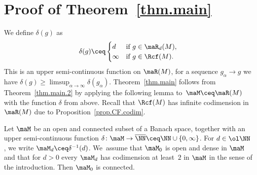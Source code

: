 \section{Proof of Theorem~\ref{thm.main}}\label{sec.proof.thm.main}

We define $\delta(g)$ as
\[
\delta(g)\ceq
\begin{cases}
 d & \text{if}\ g\in \maR_d(M),\\
\infty& \text{if}\ g\in \Rcf(M) .
\end{cases}
\]
This is an upper semi-continuous function on $\maR(M)$, \ie for a sequence $g_\alpha\to g$ we have $\delta(g)\geq \limsup_{\alpha\to \infty} \delta(g_\alpha)$. Theorem~\ref{thm.main} follows from Theorem~\ref{thm.main.2} by applying the following lemma to~$\maM\ceq \maR(M)$ with the function $\delta$ from above. Recall that $\Rcf(M)$ has infinite codimension in~$\maR(M)$ due to Proposition~\ref{prop.CF.codim}.

\begin{Lemma}
Let $\maM$ be an open and connected subset of a Banach space,
together with an upper semi-continuous function $\delta\colon \maM\to\overline\NN\ceq\NN\cup\{0,\infty\}$. For $d\in\ol\NN$, we write $\maM_d\ceq \delta^{-1}(d)$. We~assume that $\maM_0$ is open and dense in $\maM$ and that for $d>0$ every $\maM_d$ has codimension at least~$2$ in $\maM$ in the sense of the introduction. Then $\maM_0$ is connected.
\end{Lemma}

